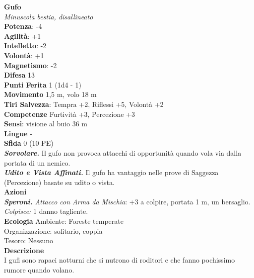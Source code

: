 \begin{multicols}{2}
\medskip\textbf{Gufo}\\
\emph{Minuscola bestia, disallineato}\\
\textbf{Potenza}: -4\\
\textbf{Agilità}: +1\\
\textbf{Intelletto}: -2\\
\textbf{Volontà}: +1\\
\textbf{Magnetismo}: -2\\
\textbf{Difesa} 13\\
\textbf{Punti Ferita} 1 (1d4 - 1)\\
\textbf{Movimento} 1,5 m, volo 18 m\\
\textbf{Tiri Salvezza}: Tempra +2, Riﬂessi +5, Volontà +2 \\
\textbf{Competenze} Furtività +3, Percezione +3\\
\textbf{Sensi}: visione al buio 36 m\\
\textbf{Lingue} -\\
\textbf{Sfida} 0 (10 PE)\smallskip\\
\emph{\textbf{Sorvolare.}} Il gufo non provoca attacchi di opportunità quando vola via dalla portata di un nemico.\\
\emph{\textbf{Udito e Vista Affinati.}} Il gufo ha vantaggio nelle prove di Saggezza (Percezione) basate su udito o vista.\\
\smallskip\textbf{Azioni}\\
\emph{\textbf{Speroni.} Attacco con Arma da Mischia}: +3 a colpire, portata 1 m, un bersaglio.\\
\emph{Colpisce:} 1 danno tagliente.\\
\textbf{Ecologia}
Ambiente: Foreste temperate\\
Organizzazione: solitario, coppia\\
Tesoro: Nessuno\\
\textbf{Descrizione}\\
I gufi sono rapaci notturni che si nutrono di roditori e che fanno pochissimo rumore quando volano. \\


\end{multicols}
